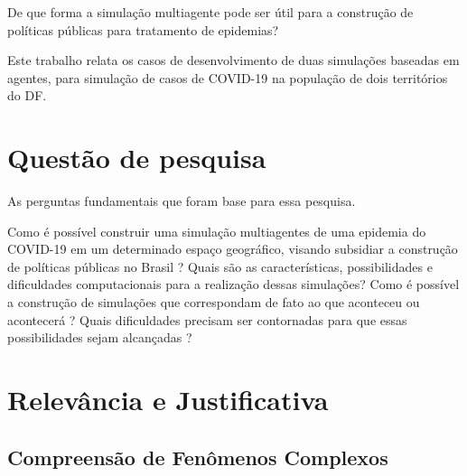 De que forma a simulação multiagente pode ser útil para a construção de políticas públicas para tratamento de epidemias?


Este trabalho relata os casos de desenvolvimento de duas simulações baseadas em agentes, para simulação de casos de COVID-19 na população de dois territórios do DF.

\section{Questão de pesquisa}%
As perguntas fundamentais que foram base para essa pesquisa.

Como é possível construir uma simulação multiagentes de uma epidemia do COVID-19 em um determinado espaço geográfico, visando subsidiar a construção de políticas públicas no Brasil ? Quais são as características, possibilidades e dificuldades computacionais para a realização dessas simulações? Como é possível a construção de simulações que correspondam de fato ao que aconteceu ou acontecerá ? Quais dificuldades precisam ser contornadas para que essas possibilidades sejam alcançadas ?


\section{Relevância e Justificativa}%





\subsection{Compreensão de Fenômenos Complexos}

